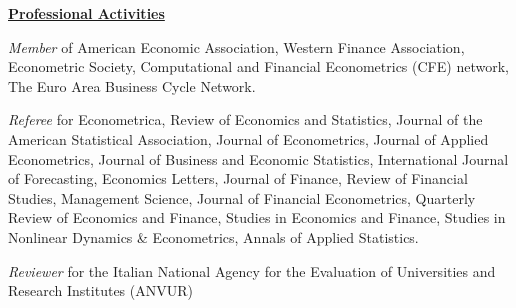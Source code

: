 \documentclass[12pt]{article}
\begin{document}
\underline{\textbf{Professional Activities}}
\begin{description}
\item\emph{Member} of American Economic Association, Western Finance Association, Econometric Society, Computational and Financial Econometrics (CFE) network, The Euro Area Business Cycle Network.

\item \emph{Referee} for Econometrica, Review of Economics and Statistics, Journal of the American Statistical Association, Journal of Econometrics, Journal of Applied Econometrics, Journal of Business and Economic Statistics, International Journal of Forecasting, Economics Letters, Journal of Finance, Review of Financial Studies, Management Science, Journal of Financial Econometrics, Quarterly Review of Economics and Finance, Studies in Economics and Finance, Studies in Nonlinear Dynamics \& Econometrics, Annals of Applied Statistics.

\item \emph{Reviewer} for the Italian National Agency for the Evaluation of Universities and Research Institutes (ANVUR) 
\end{description}
 
\end{document}
